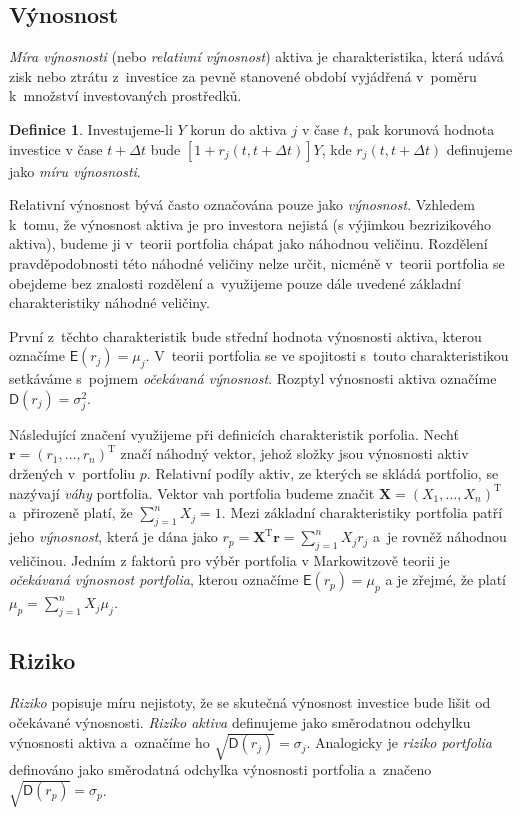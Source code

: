 \documentclass[a4paper,12pt]{report}
\theoremstyle{definition} \newtheorem{definice}[veta]{Definice}
\theoremstyle{remark}
\begin{document}
\subsection{Výnosnost}
\textit{Míra výnosnosti} (nebo \textit{relativní výnosnost}) aktiva je charakteristika, která udává zisk nebo ztrátu z~investice za pevně stanovené období vyjádřená v~poměru k~množství investovaných prostředků.

\begin{definice}
Investujeme-li $Y$ korun do aktiva $j$ v čase $t$, pak korunová hodnota investice v čase $t+\Delta t$ bude $[1+r_j(t,t+\Delta t)]Y$, kde  $r_j(t,t+\Delta t)$ definujeme jako \textit{míru výnosnosti}.  
\end{definice}
 
Relativní výnosnost bývá často označována pouze jako \textit{výnosnost}.
Vzhledem k~tomu, že výnosnost aktiva je pro investora nejistá (s výjimkou bezrizikového aktiva), budeme ji v~teorii portfolia chápat jako náhodnou veličinu. %
Rozdělení pravděpodobnosti této náhodné veličiny nelze určit, nicméně v~teorii portfolia se obejdeme bez znalosti rozdělení a~využijeme pouze dále uvedené základní charakteristiky náhodné veličiny.

První z~těchto charakteristik bude střední hodnota výnosnosti aktiva, kterou označíme $\mathsf{E}(r_j)=\mu_j$.
V~teorii portfolia se ve spojitosti s~touto charakteristikou setkáváme s~pojmem \textit{očekávaná výnosnost}.
Rozptyl výnosnosti aktiva označíme $\mathsf{D}(r_j)=\sigma_j^2$.

Následující značení využijeme při definicích charakteristik porfolia.
Nechť $\boldsymbol{r}=(r_1,\dots,r_n)^\mathrm{T}$ značí náhodný vektor, jehož složky jsou výnosnosti aktiv držených v~portfoliu $p$.
Relativní podíly aktiv, ze kterých se skládá portfolio, se nazývají \textit{váhy} portfolia.
Vektor vah portfolia budeme značit $\boldsymbol{X}=(X_1,\dots,X_n)^\mathrm{T}$ a~přirozeně platí, že $\sum_{j=1}^nX_j=1$. 
Mezi základní charakteristiky portfolia patří jeho \textit{výnosnost}, která je dána jako $r_p=\boldsymbol{X}^\mathrm{T}\boldsymbol{r}=\sum_{j=1}^nX_jr_j$ a~je rovněž náhodnou veličinou.   
Jedním z faktorů pro výběr portfolia v Markowitzově teorii je \textit{očekávaná výnosnost portfolia}, kterou označíme $\mathsf{E}(r_p)=\mu_p$ a je zřejmé, že platí $\mu_p=\sum_{j=1}^nX_j\mu_j$.

\subsection{Riziko}
\textit{Riziko} popisuje míru nejistoty, že se skutečná výnosnost investice bude lišit od očekávané výnosnosti.  
\textit{Riziko aktiva} definujeme jako směrodatnou odchylku výnosnosti aktiva a~označíme ho $\sqrt{\mathsf{D}(r_j)}=\sigma_j$.
Analogicky je \textit{riziko portfolia} definováno jako směrodatná odchylka výnosnosti portfolia a~značeno $\sqrt{\mathsf{D}(r_p)}=\sigma_p$.  
\end{document}
